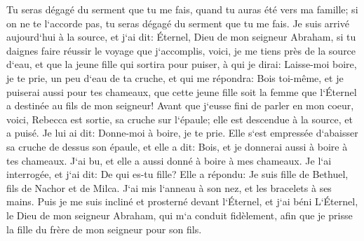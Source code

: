 \verse Tu seras dégagé du serment que tu me fais, quand tu auras été vers ma famille; si on ne te l`accorde pas, tu seras dégagé du serment que tu me fais. 
\verse Je suis arrivé aujourd`hui à la source, et j`ai dit: Éternel, Dieu de mon seigneur Abraham, si tu daignes faire réussir le voyage que j`accomplis, 
\verse voici, je me tiens près de la source d`eau, et que la jeune fille qui sortira pour puiser, à qui je dirai: Laisse-moi boire, je te prie, un peu d`eau de ta cruche, et qui me répondra: 
\verse Bois toi-même, et je puiserai aussi pour tes chameaux, que cette jeune fille soit la femme que l`Éternel a destinée au fils de mon seigneur! 
\verse Avant que j`eusse fini de parler en mon coeur, voici, Rebecca est sortie, sa cruche sur l`épaule; elle est descendue à la source, et a puisé. Je lui ai dit: Donne-moi à boire, je te prie. 
\verse Elle s`est empressée d`abaisser sa cruche de dessus son épaule, et elle a dit: Bois, et je donnerai aussi à boire à tes chameaux. J`ai bu, et elle a aussi donné à boire à mes chameaux. 
\verse Je l`ai interrogée, et j`ai dit: De qui es-tu fille? Elle a répondu: Je suis fille de Bethuel, fils de Nachor et de Milca. J`ai mis l`anneau à son nez, et les bracelets à ses mains. 
\verse Puis je me suis incliné et prosterné devant l`Éternel, et j`ai béni L`Éternel, le Dieu de mon seigneur Abraham, qui m`a conduit fidèlement, afin que je prisse la fille du frère de mon seigneur pour son fils. 
